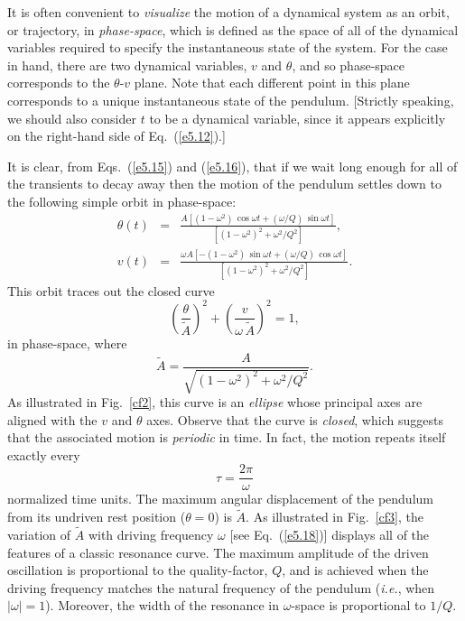 It is often convenient to {\em visualize} the motion of a dynamical system as an orbit, or  trajectory, in
{\em phase-space}, which is defined as the space of all of the dynamical variables required to
specify the instantaneous state of the system. For the case in hand, there are two dynamical
variables, $v$ and $\theta$, and so phase-space corresponds to the $\theta$-$v$ plane. Note that
each different point in this plane corresponds to a unique instantaneous state of the pendulum.
[Strictly speaking, we should also consider $t$ to be a dynamical variable, since it 
appears explicitly on the right-hand side of Eq.~(\ref{e5.12}).]

It is clear, from Eqs.~(\ref{e5.15}) and (\ref{e5.16}), that if we wait long enough for all
of the transients to decay away then the motion of the pendulum settles down to the
following simple orbit in phase-space:
\begin{eqnarray}
\theta(t) &=&
\frac{A\left[(1-\omega^2)\,\cos\omega t+ (\omega/Q)\,\sin\omega t\right]}
{\left[(1-\omega^2)^2+\omega^2/Q^2\right]},\\[0.5ex]
v(t) &=& \frac{\omega A\left[-(1-\omega^2)\,\sin\omega t+ (\omega/Q)\,\cos\omega t\right]}
{\left[(1-\omega^2)^2+\omega^2/Q^2\right]}.
\end{eqnarray}
This orbit traces out the closed curve
\begin{equation}
\left(\frac{\theta}{\tilde{A}}\right)^2 + \left(\frac{v}{\omega\,\tilde{A}}\right)^2 =1,
\end{equation}
in phase-space, where 
\begin{equation}\label{e5.18}
\tilde{A} = \frac{A}{\sqrt{(1-\omega^2)^2+\omega^2/Q^2}}.
\end{equation}
As illustrated in Fig.~\ref{cf2}, this curve is an {\em ellipse} whose principal axes are 
aligned with the $v$ and $\theta$ axes.
Observe that the curve is {\em closed}, which suggests that the associated motion is {\em periodic} in time. In fact, the
motion repeats itself exactly every
\begin{equation}
\tau = \frac{2\pi}{\omega}
\end{equation}
normalized time units. The maximum angular displacement of the pendulum from its undriven rest position
($\theta=0$) is $\tilde{A}$. 
As illustrated in Fig.~\ref{cf3}, the variation of $\tilde{A}$ with driving frequency $\omega$
[see Eq.~(\ref{e5.18})] displays all of the features of a classic resonance curve. The maximum
amplitude of the driven oscillation is proportional to the quality-factor, $Q$, and
is achieved when the driving frequency matches the natural
frequency of the pendulum ({\em i.e.}, when $|\omega|=1$). Moreover, 
the width of the resonance in $\omega$-space
is proportional to $1/Q$.

